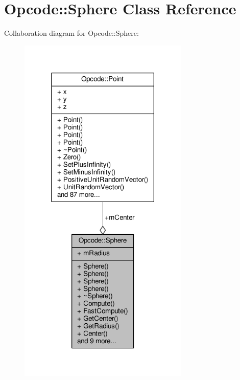 \hypertarget{classOpcode_1_1Sphere}{}\section{Opcode\+:\+:Sphere Class Reference}
\label{classOpcode_1_1Sphere}


Collaboration diagram for Opcode\+:\+:Sphere\+:
\nopagebreak
\begin{figure}[H]
\begin{center}
\leavevmode
\includegraphics[width=230pt]{dc/df2/classOpcode_1_1Sphere__coll__graph}
\end{center}
\end{figure}

